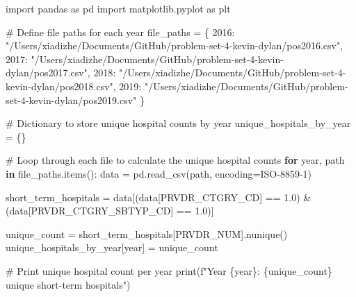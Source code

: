 \documentclass[
  letterpaper,
  DIV=11,
  numbers=noendperiod]{scrartcl}
\newenvironment{Shaded}{\begin{snugshade}}{\end{snugshade}}
\newcommand{\BuiltInTok}[1]{\textcolor[rgb]{0.00,0.23,0.31}{#1}}
\newcommand{\CommentTok}[1]{\textcolor[rgb]{0.37,0.37,0.37}{#1}}
\newcommand{\ControlFlowTok}[1]{\textcolor[rgb]{0.00,0.23,0.31}{\textbf{#1}}}
\newcommand{\DecValTok}[1]{\textcolor[rgb]{0.68,0.00,0.00}{#1}}
\newcommand{\FloatTok}[1]{\textcolor[rgb]{0.68,0.00,0.00}{#1}}
\newcommand{\ImportTok}[1]{\textcolor[rgb]{0.00,0.46,0.62}{#1}}
\newcommand{\KeywordTok}[1]{\textcolor[rgb]{0.00,0.23,0.31}{\textbf{#1}}}
\newcommand{\NormalTok}[1]{\textcolor[rgb]{0.00,0.23,0.31}{#1}}
\newcommand{\OperatorTok}[1]{\textcolor[rgb]{0.37,0.37,0.37}{#1}}
\newcommand{\SpecialCharTok}[1]{\textcolor[rgb]{0.37,0.37,0.37}{#1}}
\newcommand{\SpecialStringTok}[1]{\textcolor[rgb]{0.13,0.47,0.30}{#1}}
\newcommand{\StringTok}[1]{\textcolor[rgb]{0.13,0.47,0.30}{#1}}
\begin{document}
\begin{Shaded}
\begin{Highlighting}[]
\ImportTok{import}\NormalTok{ pandas }\ImportTok{as}\NormalTok{ pd}
\ImportTok{import}\NormalTok{ matplotlib.pyplot }\ImportTok{as}\NormalTok{ plt}

\CommentTok{\# Define file paths for each year}
\NormalTok{file\_paths }\OperatorTok{=}\NormalTok{ \{}
    \DecValTok{2016}\NormalTok{: }\StringTok{"/Users/xiadizhe/Documents/GitHub/problem{-}set{-}4{-}kevin{-}dylan/pos2016.csv"}\NormalTok{,}
    \DecValTok{2017}\NormalTok{: }\StringTok{"/Users/xiadizhe/Documents/GitHub/problem{-}set{-}4{-}kevin{-}dylan/pos2017.csv"}\NormalTok{,}
    \DecValTok{2018}\NormalTok{: }\StringTok{"/Users/xiadizhe/Documents/GitHub/problem{-}set{-}4{-}kevin{-}dylan/pos2018.csv"}\NormalTok{,}
    \DecValTok{2019}\NormalTok{: }\StringTok{"/Users/xiadizhe/Documents/GitHub/problem{-}set{-}4{-}kevin{-}dylan/pos2019.csv"}
\NormalTok{\}}

\CommentTok{\# Dictionary to store unique hospital counts by year}
\NormalTok{unique\_hospitals\_by\_year }\OperatorTok{=}\NormalTok{ \{\}}

\CommentTok{\# Loop through each file to calculate the unique hospital counts}
\ControlFlowTok{for}\NormalTok{ year, path }\KeywordTok{in}\NormalTok{ file\_paths.items():}
\NormalTok{    data }\OperatorTok{=}\NormalTok{ pd.read\_csv(path, encoding}\OperatorTok{=}\StringTok{\textquotesingle{}ISO{-}8859{-}1\textquotesingle{}}\NormalTok{)}
    
\NormalTok{    short\_term\_hospitals }\OperatorTok{=}\NormalTok{ data[(data[}\StringTok{\textquotesingle{}PRVDR\_CTGRY\_CD\textquotesingle{}}\NormalTok{] }\OperatorTok{==} \FloatTok{1.0}\NormalTok{) }\OperatorTok{\&}\NormalTok{ (data[}\StringTok{\textquotesingle{}PRVDR\_CTGRY\_SBTYP\_CD\textquotesingle{}}\NormalTok{] }\OperatorTok{==} \FloatTok{1.0}\NormalTok{)]}
    
\NormalTok{    unique\_count }\OperatorTok{=}\NormalTok{ short\_term\_hospitals[}\StringTok{\textquotesingle{}PRVDR\_NUM\textquotesingle{}}\NormalTok{].nunique()}
\NormalTok{    unique\_hospitals\_by\_year[year] }\OperatorTok{=}\NormalTok{ unique\_count}
    
    \CommentTok{\# Print unique hospital count per year}
    \BuiltInTok{print}\NormalTok{(}\SpecialStringTok{f"Year }\SpecialCharTok{\{}\NormalTok{year}\SpecialCharTok{\}}\SpecialStringTok{: }\SpecialCharTok{\{}\NormalTok{unique\_count}\SpecialCharTok{\}}\SpecialStringTok{ unique short{-}term hospitals"}\NormalTok{)}


\end{Highlighting}
\end{Shaded}
\end{document}
